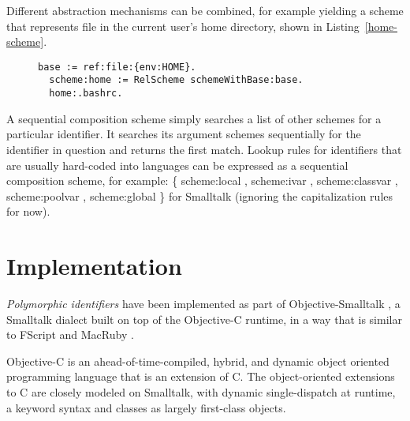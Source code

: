 \documentclass[preprint,authoryear]{acm_proc_article-sp}
\begin{document}
Different abstraction mechanisms can be combined, for example yielding
a scheme that represents file in the current user's home directory, shown
in Listing~\ref{home-scheme}.


\begin{figure}[htbp]
\begin{lstlisting}[style=L,label=home-scheme,caption=Accessing .bashrc via custom home: scheme.]
  base := ref:file:{env:HOME}.
  scheme:home := RelScheme schemeWithBase:base.
  home:.bashrc.
\end{lstlisting}
\end{figure}

A sequential composition scheme simply searches a list of other schemes
for a particular identifier.  It searches its argument schemes sequentially
for the identifier in question and returns the first match.  Lookup rules for
identifiers that are usually hard-coded into languages can be expressed
as a sequential composition scheme, for example:   \{ scheme:local ,
scheme:ivar , scheme:classvar , scheme:poolvar , scheme:global \} for Smalltalk 
(ignoring the capitalization rules for now).


\section{Implementation}
\label{implementation}

\emph{Polymorphic identifiers} have been implemented as part of Objective-Smalltalk \cite{objst},
a Smalltalk dialect built on top of the Objective-C\cite{objc-evol}\cite{objc-apple} runtime, 
in a way that is similar to FScript\cite{fscript} and MacRuby \cite{macruby}.

Objective-C is an ahead-of-time-compiled, hybrid, and dynamic object oriented programming language
that is an extension of C.  The object-oriented extensions to C are closely modeled on
Smalltalk, with dynamic single-dispatch at runtime, a keyword syntax and classes as
largely first-class objects.
\end{document}
